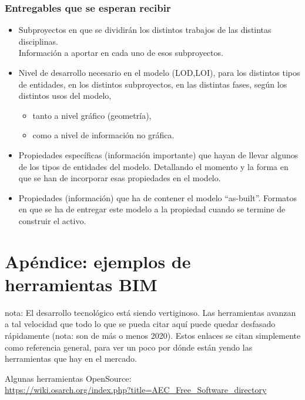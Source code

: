 \documentclass[spanish,12pt,a4paper,final,oneside]{book}
\begin{document}
\subsection{Entregables que se esperan recibir}
\begin{itemize}

\item Subproyectos en que se dividirán los distintos trabajos de las distintas disciplinas.
\\Información a aportar en cada uno de esos subproyectos.

\item Nivel de desarrollo necesario en el modelo (LOD,LOI), para los distintos tipos de entidades, en los distintos subproyectos, en las distintas fases, según los distintos usos del modelo,
\begin{itemize}
\item tanto a nivel gráfico (geometría),
\item como a nivel de información no gráfica.
\end{itemize}

\item Propiedades específicas (información importante) que hayan de llevar algunos de los tipos de entidades del modelo. Detallando el momento y la forma en que se han de incorporar esas propiedades en el modelo.

\item Propiedades (información) que ha de contener el modelo ``as-built''. Formatos en que se ha de entregar este modelo a la propiedad cuando se termine de construir el activo.

\end{itemize}



\chapter{Apéndice: ejemplos de herramientas BIM}
nota: El desarrollo tecnológico está siendo vertiginoso. Las herramientas avanzan a tal velocidad que todo lo que se pueda citar aquí puede quedar desfasado rápidamente (nota: son de más o menos 2020). Estos enlaces se citan simplemente como referencia general, para ver un poco por dónde están yendo las herramientas que hay en el mercado.

\vspace{0.5cm}
Algunas herramientas OpenSource:
\\ \url{https://wiki.osarch.org/index.php?title=AEC_Free_Software_directory}
\end{document}
